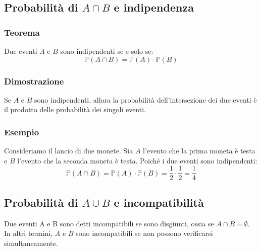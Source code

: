 \documentclass{article}
\begin{document}
\newpage
\subsection{Probabilità di \(A \cap B\) e indipendenza}

\subsubsection{Teorema}
Due eventi \(A\) e \(B\) sono indipendenti se e solo se:
\[
    \mathbb{P}(A \cap B) = \mathbb{P}(A) \cdot \mathbb{P}(B)
\]

\subsubsection{Dimostrazione}
Se \(A\) e \(B\) sono indipendenti, allora la probabilità dell'intersezione dei due eventi è
il prodotto delle probabilità dei singoli eventi.


\subsubsection{Esempio}
Consideriamo il lancio di due monete. Sia \(A\) l'evento che la prima moneta è testa e \(B\) l'evento che la seconda moneta è testa. Poiché i due eventi sono indipendenti:
\[
    \mathbb{P}(A \cap B) = \mathbb{P}(A) \cdot \mathbb{P}(B) = \frac{1}{2} \cdot \frac{1}{2} = \frac{1}{4}
\]

\newpage
\subsection{Probabilità di \(A \cup B\) e incompatibilità}
Due eventi A e B sono detti incompatibili se sono disgiunti, ossia se \(A \cap B = \emptyset\).\\
In altri termini, \(A\) e \(B\) sono incompatibili se non possono verificarsi simultaneamente.
\end{document}
